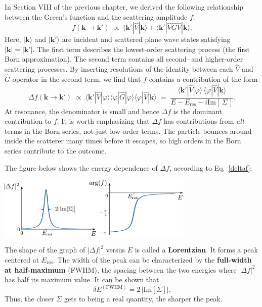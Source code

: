 \documentclass[pra,12pt]{revtex4}
\begin{document}
In Section VIII of the previous chapter, we derived the following
relationship between the Green's function and the scattering amplitude
$f$:
\begin{equation}
  f(\mathbf{k}\rightarrow\mathbf{k}') \;\propto\; \langle \mathbf{k}'|\hat{V}|\mathbf{k}\rangle + \langle \mathbf{k}'|\hat{V}\hat{G}\hat{V}|\mathbf{k}\rangle.
\end{equation}
Here, $|\mathbf{k}\rangle$ and $|\mathbf{k}'\rangle$ are incident and
scattered plane wave states satisfying $|\mathbf{k}|=|\mathbf{k}'|$.
The first term describes the lowest-order scattering process (the
first Born approximation).  The second term contains all second- and
higher-order scattering processes.  By inserting resolutions of the
identity between each $\hat{V}$ and $\hat{G}$ operator in the second
term, we find that $f$ contains a contribution of the form
\begin{equation}
  \Delta f(\mathbf{k}\rightarrow\mathbf{k}') \;\propto\; \langle \mathbf{k}'|\hat{V}|\varphi\rangle\langle\varphi|\hat{G}|\varphi\rangle\langle\varphi|\hat{V}|\mathbf{k}\rangle \;=\; \frac{\langle \mathbf{k}'|\hat{V}|\varphi\rangle \, \langle\varphi|\hat{V}|\mathbf{k}\rangle}{\displaystyle E - E_{\mathrm{res}} - i \mathrm{Im}[\,\Sigma\,]}.
  \label{deltaf}
\end{equation}
At resonance, the denominator is small and hence $\Delta f$ is the
dominant contribution to $f$.  It is worth emphasizing that $\Delta f$
has contributions from \textit{all} terms in the Born series, not just
low-order terms.  The particle bounces around inside the scatterer
many times before it escapes, so high orders in the Born series
contribute to the outcome.

The figure below shows the energy dependence of $\Delta f$, according
to Eq.~\eqref{deltaf}:

\begin{center}
  \includegraphics[width=0.7\textwidth]{resonance}  
\end{center}

\noindent
The shape of the graph of $|\Delta f|^2$ versus $E$ is called a
\textbf{Lorentzian}.  It forms a peak centered at $E_{\mathrm{res}}$.
The width of the peak can be characterized by the \textbf{full-width
  at half-maximum} (FWHM), the spacing between the two energies where
$|\Delta f|^2$ has half its maximum value.  It can be shown that
\begin{equation}
  \delta E^{(\mathrm{FWHM})} = 2\, \Big|\mathrm{Im}[\Sigma]\Big|.
\end{equation}
Thus, the closer $\Sigma$ gets to being a real quantity, the sharper
the peak.
\end{document}

